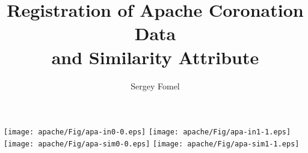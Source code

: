 \documentclass[25pt,headrule,footrule,dvips,landscape]{foils}
\title{Registration of Apache Coronation Data \\ and Similarity Attribute}
\author{Sergey Fomel}
\begin{document}
  \maketitle 
  \begin{center}
    \texttt{[image: apache/Fig/apa-in0-0.eps]} \newpage
    \texttt{[image: apache/Fig/apa-in1-1.eps]} \newpage
    \texttt{[image: apache/Fig/apa-sim0-0.eps]} \newpage 
    \texttt{[image: apache/Fig/apa-sim1-1.eps]} 
  \end{center}
\end{document}
